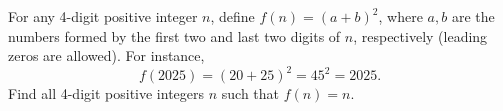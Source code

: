 For any 4-digit positive integer $n$, define $f(n)=(a+b)^2$, where $a,b$ are the numbers formed by the first two and last two digits of $n$, respectively (leading zeros are allowed). For instance,$$f(2025) = (20+25)^2 = 45^2 = 2025.$$Find all 4-digit positive integers $n$ such that $f(n)=n$.